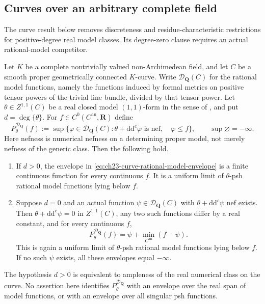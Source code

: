 \subsection{Curves over an arbitrary complete field}
\label{sec:ch23-later-curves}

The curve result below removes discreteness and residue-characteristic
restrictions for positive-degree real model classes.  Its degree-zero
clause requires an actual rational-model competitor.

\begin{theorem}
\label{thm:ch23-gjkm-curves}
Let $K$ be a complete nontrivially valued non-Archimedean field, and let
$C$ be a smooth proper geometrically connected $K$-curve.  Write
$\mathcal D_{\mathbf Q}(C)$ for the rational model functions, namely the
functions induced by formal metrics on positive tensor powers of the
trivial line bundle, divided by that tensor power.  Let
$\theta\in Z^{1,1}(C)$ be a real closed model $(1,1)$-form in the sense of
\cite[\S\S2.3--2.7]{GJKM19}, and put $d=\deg\{\theta\}$.
For $f\in C^0(C^{\mathrm{an}},\mathbf R)$ define
\begin{equation}
\label{eq:ch23-curve-rational-model-envelope}
 P^{\mathcal D_{\mathbf Q}}_\theta(f)
 :=\sup\{\varphi\in\mathcal D_{\mathbf Q}(C):
             \theta+\mathrm d\mathrm d^c\varphi\text{ is nef},\quad
             \varphi\leq f\},
 \qquad \sup\varnothing=-\infty.
\end{equation}
Here nefness is numerical nefness on a determining proper model, not
merely nefness of the generic class.  Then the following hold.
\begin{enumerate}
\item If $d>0$, the envelope in
\eqref{eq:ch23-curve-rational-model-envelope} is a finite continuous function
for every continuous $f$.  It is a uniform limit of $\theta$-psh rational
model functions lying below $f$.
\item Suppose $d=0$ and an actual function
$\psi\in\mathcal D_{\mathbf Q}(C)$ with
$\theta+\mathrm d\mathrm d^c\psi$ nef exists.  Then
$\theta+\mathrm d\mathrm d^c\psi=0$ in $Z^{1,1}(C)$, any two such
functions differ by a real constant, and for every continuous $f$,
\begin{equation}
\label{eq:ch23-curve-degree-zero-envelope}
 P^{\mathcal D_{\mathbf Q}}_\theta(f)
       =\psi+\min_{C^{\mathrm{an}}}(f-\psi).
\end{equation}
This is again a uniform limit of $\theta$-psh rational model functions
lying below $f$.  If no such $\psi$ exists, all these envelopes equal
$-\infty$.
\end{enumerate}
The hypothesis $d>0$ is equivalent to ampleness of the real numerical
class on the curve.  No assertion here identifies
$P^{\mathcal D_{\mathbf Q}}_\theta$ with an envelope over the real span
of model functions, or with an envelope over all singular psh functions.
\end{theorem}

